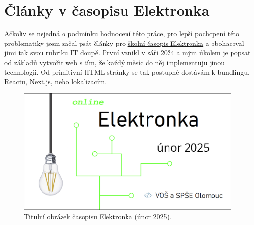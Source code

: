 \chapter{Články v časopisu Elektronka}
Ačkoliv se nejedná o podmínku hodnocení této práce, pro lepší pochopení této problematiky jsem začal psát články pro \href{https://www.spseol.cz/prace-zaku-a-studentu/casopis-elektronka}{školní časopis Elektronka}\cite{Elektronka} a obohacoval jimi tak svou rubriku \href{https://github.com/dlabaja/IT_doupe}{IT doupě}\cite{ITDoupe}. První vznikl v záři 2024 a mým úkolem je popsat od základů vytvořit web s tím, že každý měsíc do něj implementuju jinou technologii. Od primitivní HTML stránky se tak postupně dostávám k bundlingu, Reactu, Next.js, nebo lokalizacím.

\begin{figure}[!h]
    \centering
    \includegraphics[width=1\linewidth]{obrazky/elektronka.png}
    \caption{Titulní obrázek časopisu Elektronka (únor 2025).\cite{Elektronka}}
\end{figure}

